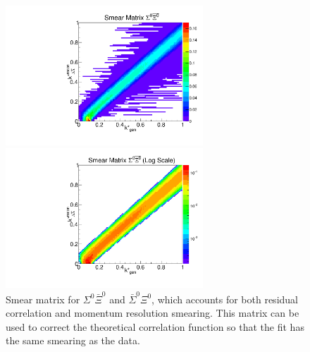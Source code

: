 \begin{figure}[ht]
\begin{minipage}{17.5pc}
\includegraphics[width=17.5pc]{Figures/SmearMatrices/2016-7-19-SmearMatrixSigmaXi0NormLA.pdf}
\end{minipage}\hspace{0.5pc}
\begin{minipage}{17.5pc}
\includegraphics[width=17.5pc]{Figures/SmearMatrices/2016-7-19-SmearMatrixSigmaXi0NormLALog.pdf}
\end{minipage} 
\caption[Smear matrix -- $\Sigma^0\bar{\Xi}^0$ and $\bar{\Sigma}^0\Xi^0$]{
Smear matrix for $\Sigma^0\bar{\Xi}^0$ and $\bar{\Sigma}^0\Xi^0$, which accounts for both residual correlation and momentum resolution smearing. This matrix can be used to correct the theoretical correlation function so that the fit has the same smearing as the data.
}
\end{figure}


